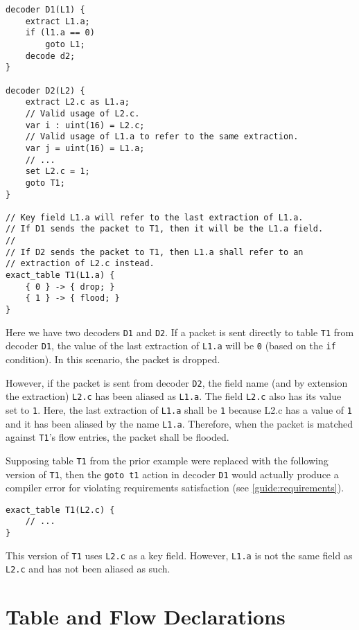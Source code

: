 \begin{minip}
\begin{lstlisting}
decoder D1(L1) {
	extract L1.a;
	if (l1.a == 0)
		goto L1;
	decode d2;
}

decoder D2(L2) {
	extract L2.c as L1.a;
	// Valid usage of L2.c.
	var i : uint(16) = L2.c;
	// Valid usage of L1.a to refer to the same extraction.
	var j = uint(16) = L1.a;
	// ...
	set L2.c = 1;
	goto T1;
}

// Key field L1.a will refer to the last extraction of L1.a.
// If D1 sends the packet to T1, then it will be the L1.a field.
// 
// If D2 sends the packet to T1, then L1.a shall refer to an
// extraction of L2.c instead.
exact_table T1(L1.a) {
	{ 0 } -> { drop; }
	{ 1 } -> { flood; }
}
\end{lstlisting}
\end{minip}

Here we have two decoders \texttt{D1} and \texttt{D2}. If a packet is sent directly to table \texttt{T1} from decoder \texttt{D1}, the value of the last extraction of \texttt{L1.a} will be \texttt{0} (based on the \texttt{if} condition). In this scenario, the packet is dropped. 

However, if the packet is sent from decoder \texttt{D2}, the field name (and by extension the extraction) \texttt{L2.c} has been aliased as \texttt{L1.a}. The field \texttt{L2.c} also has its value set to \texttt{1}. Here, the last extraction of \texttt{L1.a} shall be \texttt{1} because L2.c has a value of \texttt{1} and it has been aliased by the name \texttt{L1.a}. Therefore, when the packet is matched against \texttt{T1}'s flow entries, the packet shall be flooded.

Supposing table \texttt{T1} from the prior example were replaced with the following version of \texttt{T1}, then the \texttt{goto t1} action in decoder \texttt{D1} would actually produce a compiler error for violating requirements satisfaction (see \ref{guide:requirements}). 

\begin{minip}
\begin{lstlisting}
exact_table T1(L2.c) {
	// ...
}
\end{lstlisting}
\end{minip}

This version of \texttt{T1} uses \texttt{L2.c} as a key field. However, \texttt{L1.a} is not the same field as \texttt{L2.c} and has not been aliased as such.

\section{Table and Flow Declarations} \label{guide:tables}

